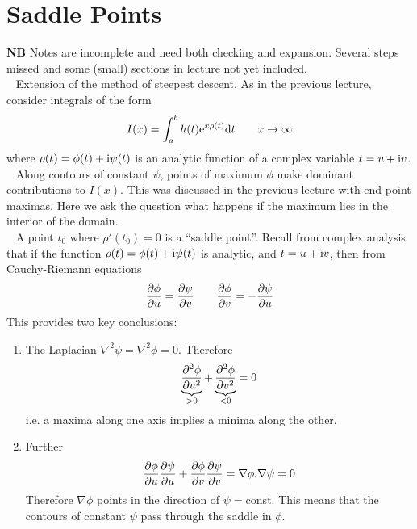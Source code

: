 \chapter{Saddle Points}
{\bf NB} Notes are incomplete and need both checking and expansion. Several steps missed and some (small) sections in lecture not yet included. \\  
\ \newline
Extension of the method of steepest descent. As in the previous lecture, consider integrals of the form
\begin{gather*}
	I(x) = \int_{a}^{b} h(t) \mathrm{e}^{x \rho(t)} \mathrm{d} t \qquad x \rightarrow \infty
\end{gather*}
where $\rho(t) = \phi(t)+ \mathrm{i} \psi(t)$ is an analytic function of a complex variable $t = u + \mathrm{i} v$. \\
\ \newline
Along contours of constant $\psi$, points of maximum $\phi$ make dominant contributions to $I(x)$. This was discussed in the previous lecture with end point maximas. Here we ask the question what happens if the maximum lies in the interior of the domain. \\
\ \newline
A point $t_0$ where $\rho'(t_0)=0$ is a ``saddle point''. Recall from complex analysis that if the function $\rho(t) = \phi(t) + \mathrm{i} \psi (t)$ is analytic, and $t = u + \mathrm{i} v$, then from Cauchy-Riemann equations
\begin{align*}
	\frac{\partial \phi}{\partial u}  = \frac{\partial \psi}{\partial v} \qquad \frac{\partial \phi}{\partial v} = - \frac{\partial \psi}{\partial u}
\end{align*}
This provides two key conclusions:
\begin{enumerate}
	\item The Laplacian $\nabla^2 \psi = \nabla^2 \phi = 0$. Therefore
	\begin{gather*}
		\underbrace{\frac{\partial^2 \phi}{\partial u^2}}_{>0} + \underbrace{\frac{\partial^2 \phi}{\partial v^2}}_{<0} = 0
	\end{gather*}
	i.e. a maxima along one axis implies a minima along the other.
	\item Further
	\begin{align*}
		\frac{\partial \phi}{\partial u}\frac{\partial \psi}{\partial u} + \frac{\partial \phi}{\partial v}\frac{\partial \psi}{\partial v} = \nabla \phi . \nabla \psi = 0
	\end{align*}
	Therefore $\nabla \phi$ points in the direction of $\psi=$const. This means that the contours of constant $\psi$ pass through the saddle in $\phi$.
\end{enumerate}


